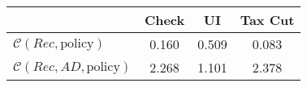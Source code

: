 \begin{tabular}{@{}lccc@{}} 
\toprule 
                          & Check      & UI    & Tax Cut    \\  \midrule 
$\mathcal{C}(Rec,\text{policy})$ & 0.160  & 0.509  & 0.083     \\ 
$\mathcal{C}(Rec, AD,\text{policy})$ & 2.268  & 1.101  & 2.378     \\ 
\end{tabular}  
